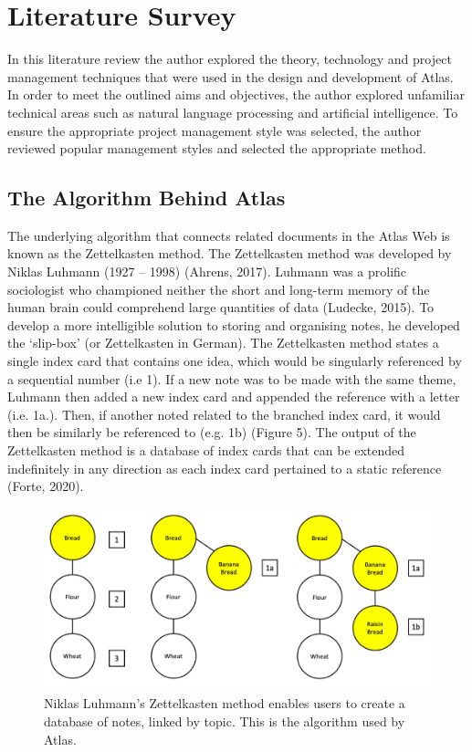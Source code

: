 \documentclass{article}
\begin{document}
\newpage

\section{Literature Survey}

In this literature review the author explored the theory, technology and project management techniques that were used in the design and development of Atlas. In order to meet the outlined aims and objectives, the author explored unfamiliar technical areas such as natural language processing and artificial intelligence. To ensure the appropriate project management style was selected, the author reviewed popular management styles and selected the appropriate method.

\subsection{The Algorithm Behind Atlas}

The underlying algorithm that connects related documents in the Atlas Web is known as the Zettelkasten method. The Zettelkasten method was developed by Niklas Luhmann (1927 – 1998) (Ahrens, 2017). Luhmann was a prolific sociologist who championed neither the short and long-term memory of the human brain could comprehend large quantities of data (Ludecke, 2015). To develop a more intelligible solution to storing and organising notes, he developed the ‘slip-box’ (or Zettelkasten in German). The Zettelkasten method states a single index card that contains one idea, which would be singularly referenced by a sequential number (i.e 1). If a new note was to be made with the same theme, Luhmann then added a new index card and appended the reference with a letter (i.e. 1a.). Then, if another noted related to the branched index card, it would then be similarly be referenced to (e.g. 1b) (Figure 5). The output of the Zettelkasten method is a database of index cards that can be extended indefinitely in any direction as each index card pertained to a static reference (Forte, 2020). 

\begin{figure}[!htb]
  \centering
      \includegraphics[width=1\textwidth]{images/litreview-zettelkasten.png}
  \caption{Niklas Luhmann’s Zettelkasten method enables users to create a database of notes, linked by topic. This is the algorithm used by Atlas.}
\end{figure}
\end{document}
